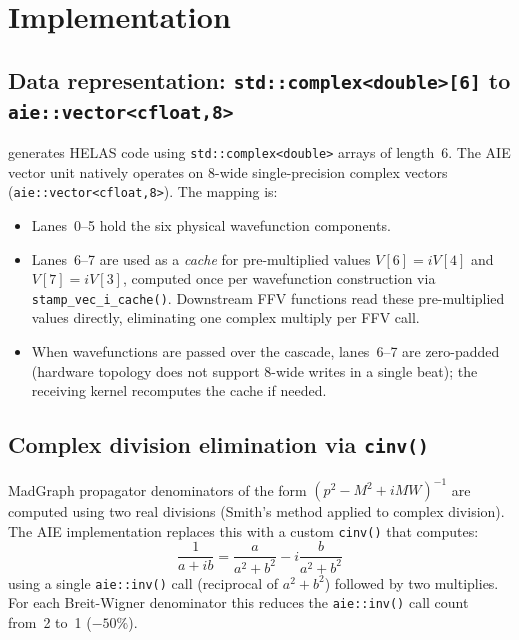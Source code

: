 
\section{Implementation}\label{sec:implementation}

\subsection{Data representation: \texttt{std::complex<double>[6]} to
\texttt{aie::vector<cfloat,8>}}

\mgfive generates HELAS code using \texttt{std::complex<double>}
arrays of length~6.  The AIE vector unit natively operates on 8-wide
single-precision complex vectors (\texttt{aie::vector<cfloat,8>}).  The
mapping is:
\begin{itemize}
  \item Lanes~0--5 hold the six physical wavefunction components.
  \item Lanes~6--7 are used as a \emph{cache} for pre-multiplied values
    $V[6] = i V[4]$ and $V[7] = i V[3]$, computed once per wavefunction
    construction via \texttt{stamp\_vec\_i\_cache()}.  Downstream FFV
    functions read these pre-multiplied values directly, eliminating one
    complex multiply per FFV call.
  \item When wavefunctions are passed over the cascade, lanes~6--7 are
    zero-padded (hardware topology does not support 8-wide writes in a single
    beat); the receiving kernel recomputes the cache if needed.
\end{itemize}

\subsection{Complex division elimination via \texttt{cinv()}}

MadGraph propagator denominators of the form $(p^2 - M^2 + iMW)^{-1}$ are
computed using two real divisions (Smith's method applied to complex division).
The AIE implementation replaces this with a custom \texttt{cinv()} that
computes:
\begin{equation}
  \frac{1}{a + ib} = \frac{a}{a^2+b^2} - i\frac{b}{a^2+b^2}
\end{equation}
using a single \texttt{aie::inv()} call (reciprocal of $a^2+b^2$) followed by
two multiplies.  For each Breit-Wigner denominator this reduces the
\texttt{aie::inv()} call count from~2 to~1 ($-50\%$).

